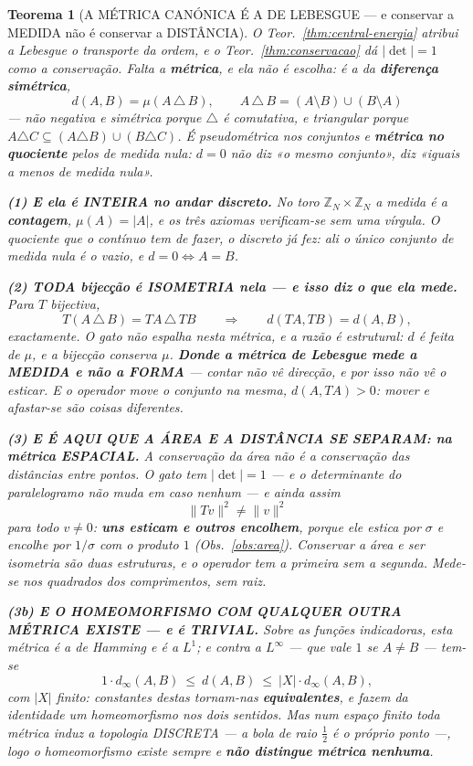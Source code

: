 \documentclass[11pt,a4paper]{article}
\newtheorem{teorema}{Teorema}
\newcommand{\abs}[1]{\lvert #1\rvert}
\newcommand{\norm}[1]{\lVert #1\rVert}
\begin{document}
\begin{teorema}[A MÉTRICA CANÓNICA É A DE LEBESGUE --- e conservar a MEDIDA não é
conservar a DISTÂNCIA]\label{thm:metrica}
O Teor.~\ref{thm:central-energia} atribui a Lebesgue o \emph{transporte da ordem}, e o
Teor.~\ref{thm:conservacao} dá $\abs{\det}=1$ como a conservação. Falta a \textbf{métrica},
e ela não é escolha: é a da \textbf{diferença simétrica},
\[
\boxed{\;d(A,B)=\mu(A\,\triangle\,B),\qquad A\,\triangle\,B=(A\setminus B)\cup(B\setminus A)\;}
\]
--- não negativa e simétrica porque $\triangle$ é comutativa, e triangular porque
$A\triangle C\subseteq(A\triangle B)\cup(B\triangle C)$. É \emph{pseudo}métrica nos
conjuntos e \textbf{métrica no quociente} pelos de medida nula: $d=0$ não diz «o mesmo
conjunto», diz «iguais a menos de medida nula».

\textbf{(1) E ela é INTEIRA no andar discreto.} No toro $\mathbb{Z}_N\times\mathbb{Z}_N$ a
medida é a \textbf{contagem}, $\mu(A)=\abs{A}$, e os três axiomas verificam-se sem uma
vírgula. \emph{O quociente que o contínuo tem de fazer, o discreto já fez}: ali o único
conjunto de medida nula é o vazio, e $d=0\iff A=B$.

\textbf{(2) TODA bijecção é ISOMETRIA nela --- e isso diz o que ela mede.} Para $T$
bijectiva,
\[
T(A\,\triangle\,B)=TA\,\triangle\,TB \qquad\Longrightarrow\qquad d(TA,TB)=d(A,B),
\]
\emph{exactamente}. O gato não espalha nesta métrica, e a razão é estrutural: $d$ é feita
de $\mu$, e a bijecção conserva $\mu$. \textbf{Donde a métrica de Lebesgue mede a MEDIDA e
não a FORMA} --- contar não vê direcção, e por isso não vê o esticar. E o operador
\emph{move} o conjunto na mesma, $d(A,TA)>0$: \emph{mover e afastar-se são coisas
diferentes}.

\textbf{(3) E É AQUI QUE A ÁREA E A DISTÂNCIA SE SEPARAM: na métrica ESPACIAL.} A
conservação da área não é a conservação das distâncias \emph{entre pontos}. O gato tem
$\abs{\det}=1$ --- e o determinante do paralelogramo não muda em caso nenhum --- e ainda
assim
\[
\norm{Tv}^{2}\neq\norm{v}^{2}
\]
para todo $v\neq0$: \textbf{uns esticam e outros encolhem}, porque ele estica por $\sigma$
e encolhe por $1/\sigma$ com o produto $1$ (Obs.~\ref{obs:area}). \emph{Conservar a área e
ser isometria são duas estruturas, e o operador tem a primeira sem a segunda.} Mede-se nos
quadrados dos comprimentos, sem raiz.

\textbf{(3b) E O HOMEOMORFISMO COM QUALQUER OUTRA MÉTRICA EXISTE --- e é TRIVIAL.} Sobre
as funções indicadoras, esta métrica \emph{é} a de Hamming e \emph{é} a $L^{1}$; e contra a
$L^{\infty}$ --- que vale $1$ se $A\neq B$ --- tem-se
\[
1\cdot d_{\infty}(A,B)\ \leq\ d(A,B)\ \leq\ \abs{X}\cdot d_{\infty}(A,B),
\]
com $\abs{X}$ finito: constantes destas tornam-nas \textbf{equivalentes}, e fazem da
\emph{identidade} um homeomorfismo nos dois sentidos. \emph{Mas num espaço finito toda
métrica induz a topologia DISCRETA} --- a bola de raio $\tfrac12$ é o próprio ponto ---,
logo o homeomorfismo existe sempre e \textbf{não distingue métrica nenhuma}.


\end{teorema}
\end{document}

